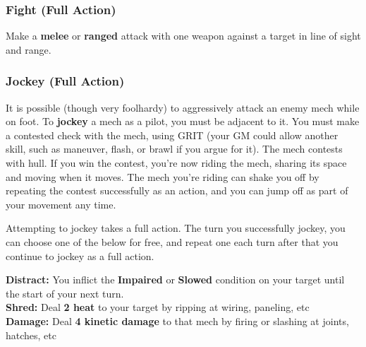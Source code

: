 \subsubsection{Fight (Full Action)}
Make a \textbf{melee} or \textbf{ranged} attack with one weapon against a target in line of sight and range.

\subsubsection{Jockey (Full Action)}
It is possible (though very foolhardy) to aggressively attack an enemy mech while on foot. To \textbf{jockey} a mech as a pilot, you must be adjacent to it. You must make a contested check with the mech, using GRIT (your GM could allow another skill, such as maneuver, flash, or brawl if you argue for it). The mech contests with hull. If you win the contest, you’re now riding the mech, sharing its space and moving when it moves. The mech you’re riding can shake you off by repeating the contest successfully as an action, and you can jump off as part of your movement any time. 

Attempting to jockey takes a full action. The turn you successfully jockey, you can choose one of the below for free, and repeat one each turn after that you continue to jockey as a full action.

\textbf{Distract:} You inflict the \textbf{Impaired} or \textbf{Slowed} condition on your target until the start of your next turn.\\
\textbf{Shred:} Deal \textbf{2 heat} to your target by ripping at wiring, paneling, etc\\
\textbf{Damage:} Deal \textbf{4 kinetic damage} to that mech by firing or slashing at joints, hatches, etc